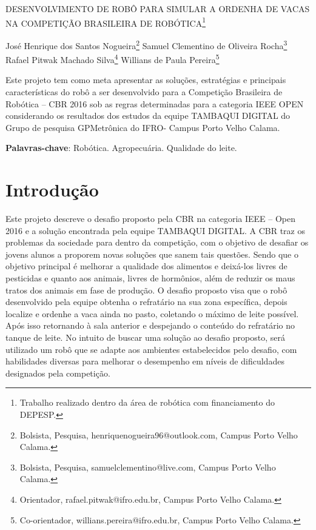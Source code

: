 \documentclass[article,12pt,onesidea,4paper,english,brazil]{abntex2}
\begin{document}
	
	
	\frenchspacing 
	
	\begin{center}
		\LARGE DESENVOLVIMENTO DE ROBÔ PARA SIMULAR A ORDENHA DE VACAS NA COMPETIÇÃO BRASILEIRA DE ROBÓTICA\footnote{ Trabalho realizado dentro da área de robótica com financiamento do DEPESP.}
		
		\normalsize
		José Henrique dos Santos Nogueira\footnote{Bolsista, Pesquisa, henriquenogueira96@outlook.com, Campus Porto Velho Calama.} 
		Samuel Clementino de Oliveira Rocha\footnote{Bolsista, Pesquisa, samuelclementino@live.com, Campus Porto Velho Calama.} \\
	Rafael Pitwak Machado Silva\footnote{ Orientador, rafael.pitwak@ifro.edu.br, Campus Porto Velho Calama.} 
		Willians de Paula Pereira\footnote{ Co-orientador, willians.pereira@ifro.edu.br, Campus Porto Velho Calama.} 
	\end{center}
	
	\begin{resumoumacoluna}
		Este projeto tem como meta apresentar as soluções, estratégias e principais características do robô a ser desenvolvido para a Competição Brasileira de Robótica – CBR 2016 sob as regras determinadas para a categoria IEEE OPEN considerando os resultados dos estudos da equipe TAMBAQUI DIGITAL do Grupo de pesquisa GPMetrônica do IFRO- Campus Porto Velho Calama.
		
		\vspace{\onelineskip}
		
		\noindent
		\textbf{Palavras-chave}: Robótica. Agropecuária. Qualidade do leite.
	\end{resumoumacoluna}
	
	\section*{Introdução}
	
	Este projeto descreve o desafio proposto pela CBR na categoria IEEE – Open 2016 e a solução encontrada pela equipe TAMBAQUI DIGITAL. A CBR traz os problemas da sociedade para dentro da competição, com o objetivo de desafiar os jovens alunos a proporem novas soluções que sanem tais questões. Sendo que o objetivo principal é melhorar a qualidade dos alimentos e deixá-los livres de pesticidas e quanto aos animais, livres de hormônios, além de reduzir os maus tratos dos animais em fase de produção. O desafio proposto visa que o robô desenvolvido pela equipe obtenha o refratário na sua zona específica, depois localize e ordenhe a vaca ainda no pasto, coletando o máximo de leite possível. Após isso retornando à sala anterior e despejando o conteúdo do refratário no tanque de leite. No intuito de buscar uma solução ao desafio proposto, será utilizado um robô que se adapte aos ambientes estabelecidos pelo desafio, com habilidades diversas para melhorar o desempenho em níveis de dificuldades designados pela competição.
	
\end{document}
